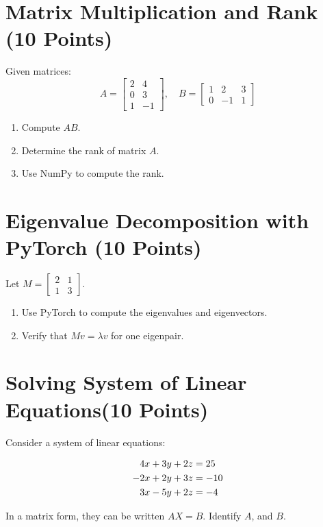 \documentclass[12pt, xcolor=dvipsnames,svgnames,x11names]{article}
\makeatletter
\newenvironment{multiequation}[1][]{%
\begin{equation}%
   \begin{aligned}%
   \ifx#1\@empty\else\label{#1}\fi%
}{%
   \end{aligned}%
\end{equation}%
}
\makeatother
\begin{document}
\section{Matrix Multiplication and Rank (10 Points)}
Given matrices: 
\[
A = \begin{bmatrix} 2 & 4 \\ 0 & 3 \\ 1 & -1 \end{bmatrix}, \quad B = \begin{bmatrix} 1 & 2 & 3 \\ 0 & -1 & 1 \end{bmatrix}
\]
\begin{enumerate}
      \item Compute $AB$.
      \item Determine the rank of matrix $A$.
      \item Use NumPy to compute the rank.
\end{enumerate}

\section{Eigenvalue Decomposition with PyTorch (10 Points)}
Let $M = \begin{bmatrix} 2 & 1 \\ 1 & 3 \end{bmatrix}$.
\begin{enumerate}
      \item Use PyTorch to compute the eigenvalues and eigenvectors.
      \item Verify that $Mv = \lambda v$ for one eigenpair.
\end{enumerate}

\bigskip



\section{Solving System of Linear Equations(10 Points)}

Consider a system of linear equations:

\begin{multiequation}
4x + 3y + 2z & = 25\\
-2x + 2y + 3z & = -10\\
3x -5y + 2z & = -4\\
\end{multiequation}

In a matrix form, they can be written $AX = B$. Identify $A$, and $B$.
\end{document}
